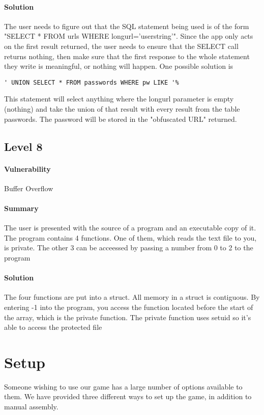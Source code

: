 \documentclass[12pt]{article}
\begin{document}
\paragraph{Solution} The user needs to figure out that the SQL statement being used is of the form 
"SELECT * FROM urls WHERE longurl='userstring'".  Since the app only acts on the first result returned, the
user needs to ensure that the SELECT call returns nothing, then make sure that the first response to the whole
statement they write is meaningful, or nothing will happen.  One possible solution is 
\begin{verbatim} 
' UNION SELECT * FROM passwords WHERE pw LIKE '%
\end{verbatim}
This statement will select anything where the longurl parameter is empty (nothing) and take the union of that
result with every result from the table passwords.  The password will be stored in the "obfuscated URL" returned.
\subsection{Level 8}
\paragraph{Vulnerability} Buffer Overflow
\paragraph{Summary} The user is presented with the source of a program and an
executable copy of it. The program contains 4 functions. One of them, which
reads the text file to you, is private. The other 3 can be acceessed by passing
a number from 0 to 2 to the program
\paragraph{Solution} The four functions are put into a struct. All memory in a
struct is contiguous. By entering -1 into the program, you access the function
located before the start of the array, which is the private function. The
private function uses setuid so it's able to access the protected file
\section{Setup}
Someone wishing to use our game has a large number of options available to them.  We have provided three different ways to set up the game, in addition to manual assembly.
\end{document}

